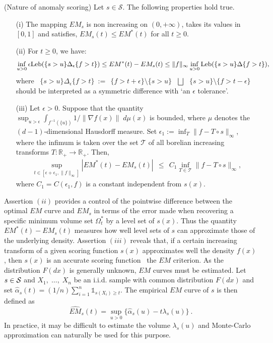 \begin{proposition}
\label{aistat:propestim} ({\sc Nature of anomaly scoring}) Let $s \in \mathcal{S}$. The following properties hold true.
\begin{enumerate}
\item[(i)] The mapping $EM_s$ is non increasing on $(0,+\infty)$, takes its values in $[0,1]$ and satisfies,
$EM_s(t) \le EM^*(t)$ for all $t\geq 0$. 
\item[(ii)]  For $t \ge 0$, we have: 
$$\inf_{u>0} \epsilon \leb (\{ s >u\}\Delta_\epsilon \{f>t\}) \le EM^*(t)-EM_s(t) \le \|f\|_\infty \inf_{u>0} \leb (\{ s >u\}\Delta\{f>t\}),$$
%
where ~$\{ s >u\}\Delta_\epsilon \{f>t\} ~:=~~ \{f>t+\epsilon\} \setminus \{ s >u\} ~~~\bigsqcup~~~ \{ s >u\} \setminus \{f>t-\epsilon\}$ should be interpreted as a symmetric difference with `an $\epsilon$ tolerance'.
\item[(iii)] Let $\epsilon >0$. Suppose that the quantity $\sup_{u>\epsilon}
  \int_{f^{-1}(\{u\})} 1/\|\nabla f(x)\|\;  d\mu(x) $ is bounded,
  where $\mu$ denotes the $(d-1)$-dimensional Hausdorff measure. Set $\epsilon_1 := \inf_{T} \|f-T\circ s\|_\infty$, where the infimum is taken over the set $\mathcal{T}$ of all borelian increasing transforms $T : \mathbb{R}_+ \rightarrow \mathbb{R}_+$. Then, 
\begin{align*}
\sup_{t\in[\epsilon + \epsilon_1,\|f\|_\infty]}|EM^*(t)-EM_s(t)| ~~\le~~  C_1 \inf_{T  \in \mathcal{T}} \|f-T\circ s\|_\infty,
\end{align*}
where $C_1=C(\epsilon_1,f)$ is a constant independent from $s(x)$.
\end{enumerate}
\end{proposition}

Assertion $(ii)$ provides a control of the pointwise difference between the
optimal $EM$ curve and $EM_s$ in terms of the error made when recovering a specific minimum volume set $\Omega_t^*$ by a level set of $s(x)$. Thus the quantity $EM^*(t)-EM_s(t)$ measures how well level sets of $s$ can approximate those of the underlying density.
Assertion $(iii)$ reveals that, if a certain increasing transform of a given scoring function $s(x)$ approximates well the density $f(x)$, then $s(x)$ is an accurate scoring function \wrt~the $EM$ criterion. %
As the distribution $F(dx)$ is generally unknown, $EM$ curves must be estimated. Let $s\in \S$ and $X_1,\; \ldots,\; X_n$ be an i.i.d. sample with common distribution $F(dx)$ and set $\widehat{\alpha}_s(t)=(1/n)\sum_{i=1}^n\mathds{1}_{s(X_i)\geq t}$. The empirical $EM$ curve of $s$ is then defined as $$\widehat{EM}_s(t)=\sup_{u>0}\{ \widehat{\alpha}_s(u)-t\lambda_s(u)\}~.$$ In practice, it may be difficult to estimate the volume $\lambda_s(u)$ and Monte-Carlo approximation can naturally be used for this purpose.


